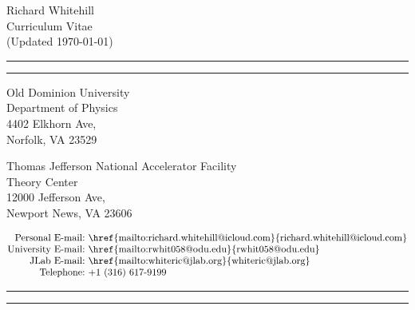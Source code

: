 \documentclass[10pt,a4paper]{article}
\begin{document}
\begin{center}
{\huge
Richard Whitehill
}
\\[0.13cm]
{
\Large
Curriculum Vitae
}
\\[0.1cm]
(Updated \today)

\vspace{0.5cm}

\hrule
\kern3pt
\hrule
\vspace*{0.4cm}

\begin{minipage}[t]{0.5\textwidth}
\begin{center}
Old Dominion University \\
Department of Physics \\
4402 Elkhorn Ave, \\
Norfolk, VA 23529 \\
\end{center}
\end{minipage}%
\begin{minipage}[t]{0.5\linewidth}
\begin{center}
Thomas Jefferson National Accelerator Facility \\
Theory Center \\
12000 Jefferson Ave, \\
Newport News, VA 23606
\end{center}
\end{minipage}
\begin{align*}
    \text{Personal E-mail:}& ~ \text{\href{mailto:richard.whitehill@icloud.com}{richard.whitehill@icloud.com}} \\[-3pt]
    \text{University E-mail:}& ~ \text{\href{mailto:rwhit058@odu.edu}{rwhit058@odu.edu}} \\[-3pt]
    \text{JLab E-mail:}& ~ \text{\href{mailto:whiteric@jlab.org}{whiteric@jlab.org}} \\[-3pt]
    \text{Telephone:}& ~ \text{+1 (316) 617-9199}
\end{align*}
\hrule
\kern3pt
\hrule

\end{center}

\vspace*{0.2cm}
\end{document}
